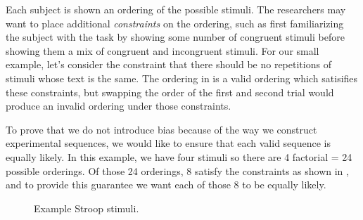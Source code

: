 Each subject is shown an ordering of the possible stimuli. The researchers may want to place additional \emph{constraints} on the ordering, such as first familiarizing the subject with the task by showing some number of congruent stimuli before showing them a mix of congruent and incongruent stimuli. For our small example, let's consider the constraint that there should be no repetitions of stimuli whose text is the same. The ordering in  is a valid ordering which satisifies these constraints, but swapping the order of the first and second trial would produce an invalid ordering under those constraints.

To prove that we do not introduce bias because of the way we construct experimental sequences, we would like to ensure that each valid sequence is equally likely. In this example, we have four stimuli so there are 4 factorial = 24 possible orderings. Of those 24 orderings, 8 satisfy the constraints as shown in , and to provide this guarantee we want each of those 8 to be equally likely.


\begin{figure}[t]%
    \centering
    \caption{Example Stroop stimuli.}%
    \label{fig:stroop_example}%
\end{figure}


